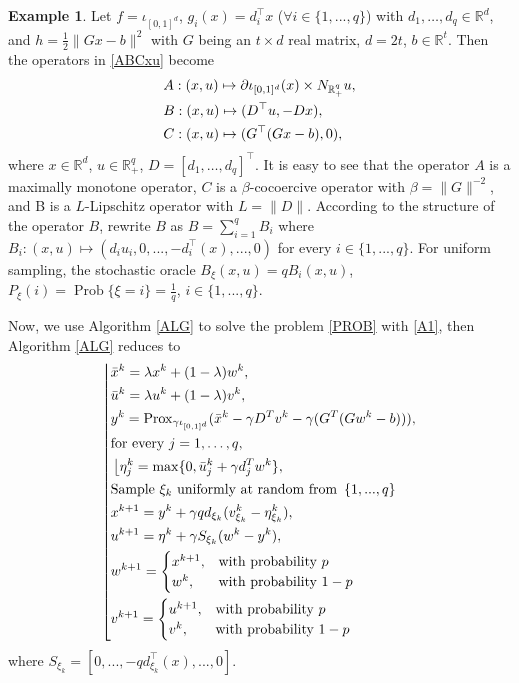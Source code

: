 \documentclass[a4paper,12pt]{article}
\theoremstyle{definition}
\newtheorem{exm}[dfn]{Example}
\DeclareMathOperator{\Pro}{Prob}
\begin{document}
\begin{exm} \label{ex1}
\rm
\noindent Let $f=\iota_{[0,1]^d}$, $g_i(x)=d_i^{\top}x$ ($\forall i \in  \{1,...,q\}$) with $d_1,\ldots,d_q\in \mathbb{R}^d$, and  $h=\frac{1}{2}\|Gx-b\|^2$ with $G$ being an $t \times d$ real matrix, $d=2t$, $b\in \mathbb{R}^t$. Then the  operators in \eqref{ABCxu} become
\begin{equation}
\label{A1}
\aligned
&A:(x,u)\mapsto\partial{\iota_{[0,1]^d}(x)}\times{N_{\mathbb{R}_+^q}u},\\
& B:(x,u)\mapsto(D^{\top}u,-Dx),\\
& C:(x,u)\mapsto(G^{\top}(Gx-b),0),\\
 \endaligned
\end{equation}
where  $x\in \mathbb{R}^d$, $u\in \mathbb{R}_+^q$, $D=[d_1,\ldots,d_q]^{\top}$. It is easy to see that the operator $A$ is a maximally monotone operator, $C$ is a $\beta$-cocoercive operator with $\beta =\|G\|^{-2}$, and B is a $L$-Lipschitz operator with $L=\|D\|$. According to the structure of the operator $B$, rewrite $B$ as $B= \sum_{i=1}^q B_i$ where $B_i:(x,u)\mapsto(d_i u_i  ,0, ...,-d_i^{\top}(x),...,0)$ for every $i \in \{1,...,q\}$. For uniform sampling, the stochastic oracle $B_{\xi}(x,u)=qB_i(x,u)$, $P_{\xi}(i)=\Pro{ \{\xi=i\}}=\frac{1}{q}$, $i \in \{1,...,q\}$.

Now, we use Algorithm \ref{ALG} to solve the problem \eqref{PROB} with \eqref{A1}, then Algorithm \ref{ALG} reduces to
\begin{equation*}
\label{2step}
\left\lfloor
\aligned
&\bar x^k=\lambda x^k+(1-\lambda)w^k,\\
&\bar u^k=\lambda u^k+(1-\lambda)v^k,\\
&y^k={\rm Prox}_{\gamma\iota_{[0,1]^d}}(\bar x^k-\gamma D^Tv^k-\gamma(G^T(Gw^k-b))),\\
&\hbox{for every}\,\, j=1,\ldots,q,\\
&\left\lfloor
\aligned
&\eta^k_{j}=\max\{0,\bar u^k_j+\gamma
d_j^Tw^k\},\\
\endaligned
\right.\\
&\hbox{Sample} \ \xi_k \ \hbox{uniformly at random from}\,\ \{1,...,q\}\\
&x^{k+1}=y^k+\gamma qd_{\xi_k}(v_{\xi_k}^k-\eta_{\xi_k}^k),\\
&u^{k+1}=\eta^k+\gamma S_{\xi_k}(w^k-y^k),\\
&w^{k+1}=
\begin{cases}
x^{k+1},&\hbox{with probability}\,\,p\\
w^k,&\hbox{with probability}\,\,1-p\\
\end{cases}\\
&v^{k+1}=
\begin{cases}
u^{k+1},&\hbox{with probability}\,\,p\\
v^k,&\hbox{with probability}\,\,1-p\\
\end{cases}\\
\endaligned
\right.
\end{equation*}
where $S_{\xi_k}=[0, ...,-qd_{\xi_k}^{\top}(x),...,0]$.


\end{exm}
\end{document}
